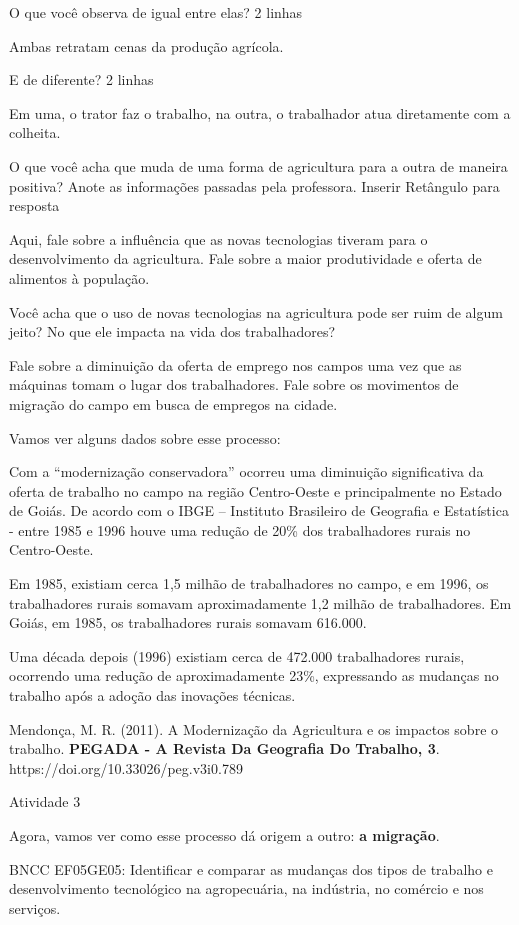 O que você observa de igual entre elas? 2 linhas

Ambas retratam cenas da produção agrícola.

E de diferente? 2 linhas

Em uma, o trator faz o trabalho, na outra, o trabalhador atua
diretamente com a colheita.

O que você acha que muda de uma forma de agricultura para a outra de
maneira positiva? Anote as informações passadas pela professora. Inserir
Retângulo para resposta

Aqui, fale sobre a influência que as novas tecnologias tiveram para o
desenvolvimento da agricultura. Fale sobre a maior produtividade e
oferta de alimentos à população.

Você acha que o uso de novas tecnologias na agricultura pode ser ruim de
algum jeito? No que ele impacta na vida dos trabalhadores?

Fale sobre a diminuição da oferta de emprego nos campos uma vez que as
máquinas tomam o lugar dos trabalhadores. Fale sobre os movimentos de
migração do campo em busca de empregos na cidade.

Vamos ver alguns dados sobre esse processo:

Com a ``modernização conservadora'' ocorreu uma diminuição significativa
da oferta de trabalho no campo na região Centro-Oeste e principalmente
no Estado de Goiás. De acordo com o IBGE -- Instituto Brasileiro de
Geografia e Estatística - entre 1985 e 1996 houve uma redução de 20\%
dos trabalhadores rurais no Centro-Oeste.

Em 1985, existiam cerca 1,5 milhão de trabalhadores no campo, e em 1996,
os trabalhadores rurais somavam aproximadamente 1,2 milhão de
trabalhadores. Em Goiás, em 1985, os trabalhadores rurais somavam
616.000.

Uma década depois (1996) existiam cerca de 472.000 trabalhadores rurais,
ocorrendo uma redução de aproximadamente 23\%, expressando as mudanças
no trabalho após a adoção das inovações técnicas.

Mendonça, M. R. (2011). A Modernização da Agricultura e os impactos
sobre o trabalho. \textbf{PEGADA - A Revista Da Geografia Do Trabalho,
3}. https://doi.org/10.33026/peg.v3i0.789

Atividade 3

Agora, vamos ver como esse processo dá origem a outro: \textbf{a
migração}.

BNCC EF05GE05: Identificar e comparar as mudanças dos tipos de trabalho
e desenvolvimento tecnológico na agropecuária, na indústria, no comércio
e nos serviços.

